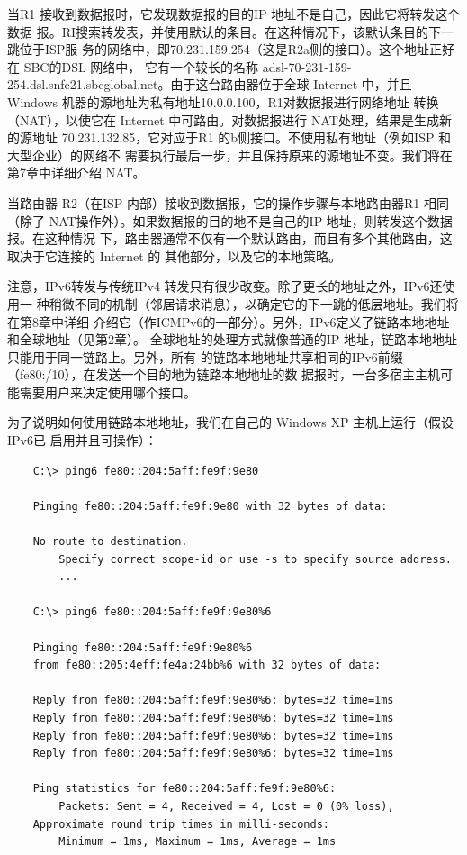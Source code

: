 当R1 接收到数据报时，它发现数据报的目的IP 地址不是自己，因此它将转发这个数据
报。RI搜索转发表，并使用默认的条目。在这种情况下，该默认条目的下一跳位于ISP服
务的网络中，即70.231.159.254（这是R2a侧的接口）。这个地址正好在 SBC的DSL 网络中，
它有一个较长的名称 adsl-70-231-159-254.dsl.snfc21.sbcglobal.net。由于这台路由器位于全球
Internet 中，并且 Windows 机器的源地址为私有地址10.0.0.100，R1对数据报进行网络地址
转换（NAT），以使它在 Internet 中可路由。对数据报进行 NAT处理，结果是生成新的源地址
70.231.132.85，它对应于R1 的b侧接口。不使用私有地址（例如ISP 和大型企业）的网络不
需要执行最后一步，并且保持原来的源地址不变。我们将在第7章中详细介绍 NAT。

当路由器 R2（在ISP 内部）接收到数据报，它的操作步骤与本地路由器R1 相同（除了
NAT操作外）。如果数据报的目的地不是自己的IP 地址，则转发这个数据报。在这种情况
下，路由器通常不仅有一个默认路由，而且有多个其他路由，这取决于它连接的 Internet 的
其他部分，以及它的本地策略。

注意，IPv6转发与传统IPv4 转发只有很少改变。除了更长的地址之外，IPv6还使用一
种稍微不同的机制（邻居请求消息），以确定它的下一跳的低层地址。我们将在第8章中详细
介绍它（作ICMPv6的一部分）。另外，IPv6定义了链路本地地址和全球地址（见第2章）。
全球地址的处理方式就像普通的IP 地址，链路本地地址只能用于同一链路上。另外，所有
的链路本地地址共享相同的IPv6前缀（fe80:/10），在发送一个目的地为链路本地地址的数
据报时，一台多宿主主机可能需要用户来决定使用哪个接口。

为了说明如何使用链路本地地址，我们在自己的 Windows XP 主机上运行（假设IPv6已
启用并且可操作）：
\begin{verbatim}
    C:\> ping6 fe80::204:5aff:fe9f:9e80

    Pinging fe80::204:5aff:fe9f:9e80 with 32 bytes of data:

    No route to destination.
        Specify correct scope-id or use -s to specify source address.
        ...

    C:\> ping6 fe80::204:5aff:fe9f:9e80%6

    Pinging fe80::204:5aff:fe9f:9e80%6
    from fe80::205:4eff:fe4a:24bb%6 with 32 bytes of data:

    Reply from fe80::204:5aff:fe9f:9e80%6: bytes=32 time=1ms
    Reply from fe80::204:5aff:fe9f:9e80%6: bytes=32 time=1ms
    Reply from fe80::204:5aff:fe9f:9e80%6: bytes=32 time=1ms
    Reply from fe80::204:5aff:fe9f:9e80%6: bytes=32 time=1ms

    Ping statistics for fe80::204:5aff:fe9f:9e80%6:
        Packets: Sent = 4, Received = 4, Lost = 0 (0% loss),
    Approximate round trip times in milli-seconds:
        Minimum = 1ms, Maximum = 1ms, Average = 1ms
\end{verbatim}

